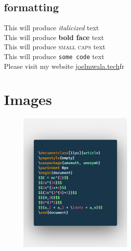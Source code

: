 \documentclass[11px, a4paper]{article}
\begin{document}
\subsection{formatting}

This will produce \textit{italicized} text  \\
This will produce \textbf{bold face} text   \\
This will produce \textsc{small caps} text  \\
This will produce \texttt{some code} text   \\
Please visit my website \href{http://www.joelmwala.tech}{joelmwala.tech}fr
\section{Images}
\begin{figure}[H]
    \begin{center}
        \includegraphics[width = 0.5\textwidth]{code1}
    \end{center}
\end{figure}
\end{document}
